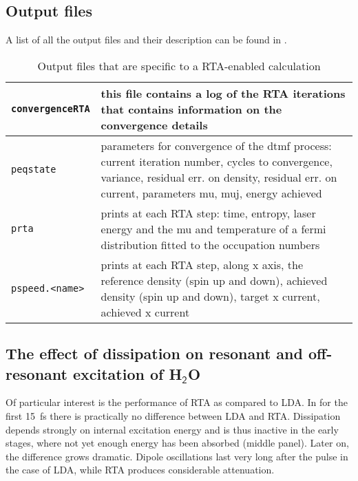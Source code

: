 \documentclass[11pt,a4paper]{article}
\begin{document}
		\subsection{Output files}
			A list of all the output files and their description can be found in .
			
			\begin{table}[t]%
				\caption{Output files that are specific to a RTA-enabled calculation}\label{tab:dynamic-output-files-rta}
				\begin{tabular}{|p{4.5cm}|p{10.2cm}|}
					\hline
					\texttt{convergenceRTA} & this file contains a log of the RTA iterations that contains information on the convergence details\\
					\hline
					\texttt{peqstate} &  parameters for convergence of the dtmf process: current iteration number, cycles to convergence, variance, residual err. on density, residual err. on current, parameters mu, muj, energy achieved\\
					\hline
					\texttt{prta} & prints at each RTA  step: time, entropy, laser energy and the mu and temperature of a fermi distribution fitted to the occupation numbers\\
					\hline
					\texttt{pspeed.<name>} & prints at each RTA step, along x axis, the reference density (spin up and down), achieved density (spin up and down), target x current, achieved x current \\
					\hline
				\end{tabular}
			\end{table}
			
		\subsection{The effect of dissipation on resonant and off-resonant excitation of H$_\mathsf{2}$O}
			Of particular interest is the performance of RTA as compared to LDA. In  for the first 15~fs there is practically no difference between LDA and RTA. Dissipation depends strongly on internal excitation energy and is thus inactive in the early stages, where not yet enough energy has been absorbed (middle panel). Later on, the difference grows dramatic. Dipole oscillations last very long after the pulse in the case of LDA, while RTA produces considerable attenuation.
			
\end{document}
